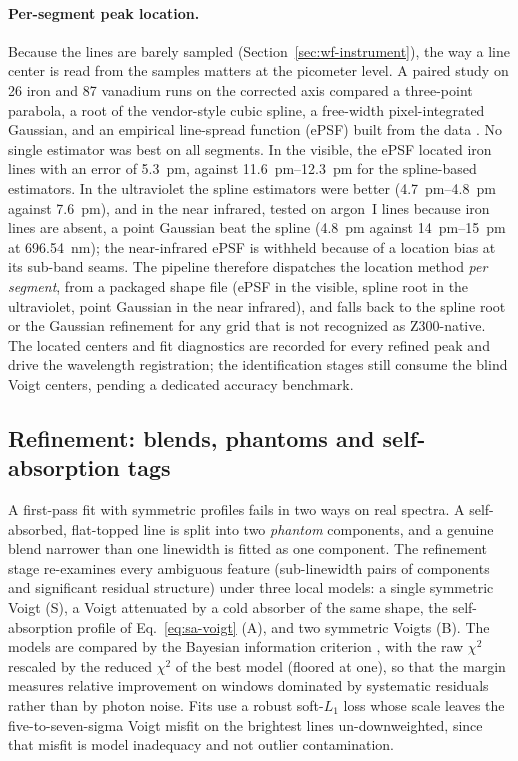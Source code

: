 \paragraph{Per-segment peak location.}
Because the lines are barely sampled (Section~\ref{sec:wf-instrument}), the way a line
center is read from the samples matters at the picometer level.
A paired study on 26 iron and 87 vanadium runs on the corrected axis compared a
three-point parabola, a root of the vendor-style cubic spline, a free-width pixel-integrated
Gaussian, and an empirical line-spread function (ePSF) built from the data
\citep{anderson2000epsf}.
No single estimator was best on all segments.
In the visible, the ePSF located iron lines with an error of \SI{5.3}{pm}, against
\SIrange{11.6}{12.3}{pm} for the spline-based estimators.
In the ultraviolet the spline estimators were better (\SIrange{4.7}{4.8}{pm} against \SI{7.6}{pm}), and in the near infrared, tested on argon~I lines because iron lines are absent, a point Gaussian beat the spline (\SI{4.8}{pm} against \SIrange{14}{15}{pm} at \SI{696.54}{nm}); the near-infrared ePSF is withheld because of a location bias at its sub-band seams.
The pipeline therefore dispatches the location method \emph{per segment}, from a packaged
shape file (ePSF in the visible, spline root in the ultraviolet, point Gaussian in the
near infrared), and falls back to the spline root or the Gaussian refinement for any grid
that is not recognized as Z300-native.
The located centers and fit diagnostics are recorded for every refined peak and drive the wavelength registration; the identification stages still consume the blind Voigt centers, pending a dedicated accuracy benchmark.

\subsection{Refinement: blends, phantoms and self-absorption tags}
\label{sec:wf-refinement}

A first-pass fit with symmetric profiles fails in two ways on real spectra.
A self-absorbed, flat-topped line is split into two \emph{phantom} components, and a
genuine blend narrower than one linewidth is fitted as one component.
The refinement stage re-examines every ambiguous feature (sub-linewidth pairs of
components and significant residual structure) under three local models: a single
symmetric Voigt (S), a Voigt attenuated by a cold absorber of the same shape, the
self-absorption profile of Eq.~\eqref{eq:sa-voigt} (A), and two symmetric Voigts (B).
The models are compared by the Bayesian information criterion \citep{schwarz1978bic},
with the raw $\chi^2$ rescaled by the reduced $\chi^2$ of the best model (floored at one),
so that the margin measures relative improvement on windows dominated by systematic
residuals rather than by photon noise.
Fits use a robust soft-$L_1$ loss \citep[cf.][]{huber1964robust} whose scale leaves the five-to-seven-sigma Voigt misfit on the brightest lines un-downweighted, since that misfit is model inadequacy and not outlier contamination.

